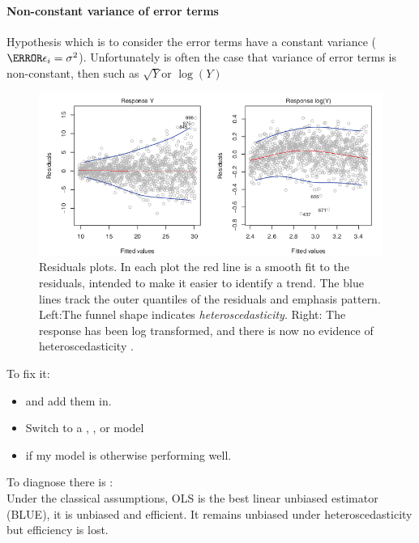 \paragraph{Non-constant variance of error terms}
Hypothesis which is to consider the error terms have a constant variance
($\V{\epsilon_{i}}=\sigma^{2}$). Unfortunately is often the case that
variance of error terms is non-constant, then  such as $\sqrt{Y}\text{
or }\log\left(Y\right)$
\begin{figure}[H]
	\begin{center}
		\includegraphics[width=\textwidth]{./chap/1chap/2sec/2images/2_8correctionOfNonConstantErrorTerms.png}
	\end{center}
	\caption{Residuals plots. In each plot the red line is a smooth
	fit to the residuals, intended to make it easier to identify
	a trend. The blue lines track the outer quantiles of the
	residuals and emphasis pattern. Left:The funnel shape indicates
	\emph{heteroscedasticity}. Right: The response has been log
	transformed, and there is now no evidence of heteroscedasticity
	.}
	\label{fig:fig2.8}
\end{figure}
To fix it: 
\begin{itemize}
	\item {}
		and add them in.
	\item Switch to a , , or  model
	\item {}
		if my model is otherwise performing well.
\end{itemize}
To diagnose there is :\\
Under the classical assumptions, OLS is the best linear unbiased estimator (BLUE), it is unbiased
and efficient. It remains unbiased under heteroscedasticity but efficiency is lost.\\
